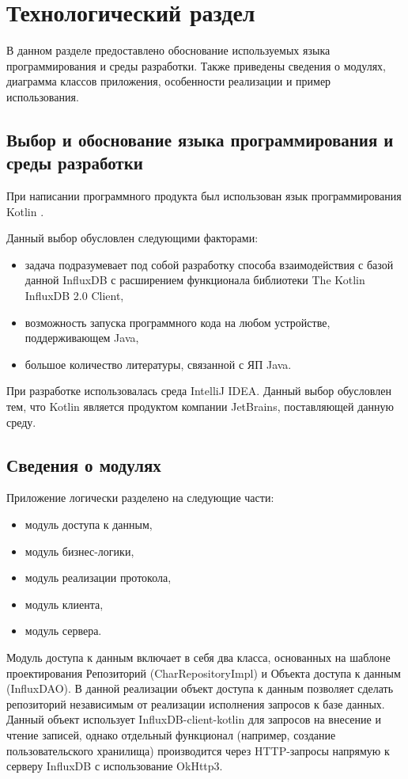 \section{Технологический раздел}
В данном разделе предоставлено обоснование используемых языка программирования и среды разработки. Также приведены сведения о модулях, диаграмма классов приложения, особенности реализации и пример использования.

\subsection{Выбор и обоснование языка программирования и среды разработки}
При написании программного продукта был использован язык программирования Kotlin \cite{Kotlin}. 

Данный выбор обусловлен следующими факторами:
\begin{itemize}
\item задача подразумевает под собой разработку способа взаимодействия с базой данной InfluxDB с расширением функционала библиотеки The Kotlin InfluxDB 2.0 Client,
\item возможность запуска программного кода на любом устройстве, поддерживающем Java,
\item большое количество литературы, связанной с ЯП Java.
\end{itemize}

При разработке использовалась среда IntelliJ IDEA. Данный выбор обусловлен тем, что Kotlin является продуктом компании JetBrains, поставляющей данную среду.

\subsection{Сведения о модулях}
Приложение логически разделено на следующие части:
\begin{itemize}
\item модуль доступа к данным,
\item модуль бизнес-логики,
\item модуль реализации протокола,
\item модуль клиента,
\item модуль сервера.
\end{itemize}

Модуль доступа к данным включает в себя два класса, основанных на шаблоне проектирования Репозиторий (CharRepositoryImpl) и Объекта доступа к данным (InfluxDAO). В данной реализации объект доступа к данным позволяет сделать репозиторий независимым от реализации исполнения запросов к базе данных. Данный объект использует InfluxDB-client-kotlin для запросов на внесение и чтение записей, однако отдельный функционал (например, создание пользовательского хранилища) производится через HTTP-запросы напрямую к серверу InfluxDB с использование OkHttp3.

